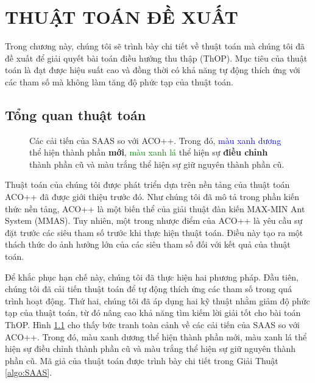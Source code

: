 \chapter{THUẬT TOÁN ĐỀ XUẤT} \label{chapter:OurProposed}

Trong chương này, chúng tôi sẽ trình bày chi tiết về thuật toán mà chúng tôi đã đề xuất để giải quyết bài toán điều hướng thu thập (ThOP). Mục tiêu của thuật toán là đạt được hiệu suất cao và đồng thời có khả năng tự động thích ứng với các tham số mà không làm tăng độ phức tạp của thuật toán.

\section{Tổng quan thuật toán} \label{section:OverallAlgo}

\begin{figure}
    \centering
    
    \caption[Các cải tiến của SAAS so với ACO++.]{Các cải tiến của SAAS so với ACO++. Trong đó, \textcolor{blue}{màu xanh dương} thể hiện thành phần \textbf{mới}, \textcolor{green}{màu xanh lá} thể hiện sự \textbf{điều chỉnh} thành phần cũ và màu trắng thể hiện sự giữ nguyên thành phần cũ.}
    \label{fig:saas_flowchart}
\end{figure}

Thuật toán của chúng tôi được phát triển dựa trên nền tảng của thuật toán ACO++ đã được giới thiệu trước đó. Như chúng tôi đã mô tả trong phần kiến thức nền tảng, ACO++ là một biến thể của giải thuật đàn kiến MAX-MIN Ant System (MMAS). Tuy nhiên, một trong nhược điểm của ACO++ là yêu cầu sự đặt trước các siêu tham số trước khi thực hiện thuật toán. Điều này tạo ra một thách thức do ảnh hưởng lớn của các siêu tham số đối với kết quả của thuật toán.

Để khắc phục hạn chế này, chúng tôi đã thực hiện hai phương pháp. Đầu tiên, chúng tôi đã cải tiến thuật toán để tự động thích ứng các tham số trong quá trình hoạt động. Thứ hai, chúng tôi đã áp dụng hai kỹ thuật nhằm giảm độ phức tạp của thuật toán, từ đó nâng cao khả năng tìm kiếm lời giải tốt cho bài toán ThOP. Hình \ref{fig:saas_flowchart} cho thấy bức tranh toàn cảnh về các cải tiến của SAAS so với ACO++. Trong đó, màu xanh dương thể hiện thành phần mới, màu xanh lá thể hiện sự điều chỉnh thành phần cũ và màu trắng thể hiện sự giữ nguyên thành phần cũ. Mã giả của thuật toán được trình bày chi tiết trong Giải Thuật \ref{algo:SAAS}.

